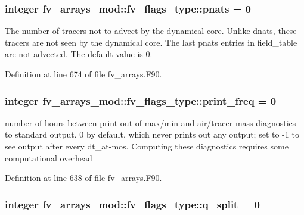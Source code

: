 \subsubsection[{pnats}]{\setlength{\rightskip}{0pt plus 5cm}integer fv\-\_\-arrays\-\_\-mod\-::fv\-\_\-flags\-\_\-type\-::pnats = 0}\label{structfv__arrays__mod_1_1fv__flags__type_ad9ce795f3fc8ee6d20219c029179f132}


The number of tracers not to advect by the dynamical core. Unlike dnats, these tracers are not seen by the dynamical core. The last pnats entries in field\-\_\-table are not advected. The default value is 0. 



Definition at line 674 of file fv\-\_\-arrays.\-F90.

\subsubsection[{print\-\_\-freq}]{\setlength{\rightskip}{0pt plus 5cm}integer fv\-\_\-arrays\-\_\-mod\-::fv\-\_\-flags\-\_\-type\-::print\-\_\-freq = 0}\label{structfv__arrays__mod_1_1fv__flags__type_abd877505252f024667e166f6bedb0e7e}


number of hours between print out of max/min and air/tracer mass diagnostics to standard output. 0 by default, which never prints out any output; set to -\/1 to see output after every dt\-\_\-at-\/mos. Computing these diagnostics requires some computational overhead 



Definition at line 638 of file fv\-\_\-arrays.\-F90.

\subsubsection[{q\-\_\-split}]{\setlength{\rightskip}{0pt plus 5cm}integer fv\-\_\-arrays\-\_\-mod\-::fv\-\_\-flags\-\_\-type\-::q\-\_\-split = 0}\label{structfv__arrays__mod_1_1fv__flags__type_a4ff876f01dc3da4224abaacc098a784a}


